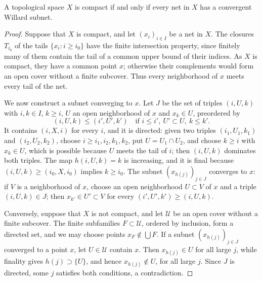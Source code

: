 \begin{proposition}\label{prop:compact-net-characterization}
A topological space $X$ is compact if and only if every net in $X$ has a convergent Willard subnet.
\end{proposition}
\begin{proof}
Suppose that $X$ is compact, and let $(x_i)_{i\in I}$ be a net in $X$. The closures $T_{i_0}$ of the tails $\{x_i:i\geq i_0\}$ have the finite intersection property, since finitely many of them contain the tail of a common upper bound of their indices. As $X$ is compact, they have a common point $x$; otherwise their complements would form an open cover without a finite subcover. Thus every neighborhood of $x$ meets every tail of the net.

We now construct a subnet converging to $x$. Let $J$ be the set of triples $(i,U,k)$ with $i,k\in I$, $k\geq i$, $U$ an open neighborhood of $x$ and $x_k\in U$, preordered by
\[
 (i,U,k)\leq(i',U',k')\quad\text{if }i\leq i',\ U'\subset U,\ k\leq k'.
\]
It contains $(i,X,i)$ for every $i$, and it is directed: given two triples $(i_1,U_1,k_1)$ and $(i_2,U_2,k_2)$, choose $i\geq i_1,i_2,k_1,k_2$, put $U=U_1\cap U_2$, and choose $k\geq i$ with $x_k\in U$, which is possible because $U$ meets the tail of $i$; then $(i,U,k)$ dominates both triples. The map $h(i,U,k)=k$ is increasing, and it is final because $(i,U,k)\geq(i_0,X,i_0)$ implies $k\geq i_0$. The subnet $(x_{h(j)})_{j\in J}$ converges to $x$: if $V$ is a neighborhood of $x$, choose an open neighborhood $U\subset V$ of $x$ and a triple $(i,U,k)\in J$; then $x_{k'}\in U'\subset V$ for every $(i',U',k')\geq(i,U,k)$.

Conversely, suppose that $X$ is not compact, and let $\mathcal U$ be an open cover without a finite subcover. The finite subfamilies $F\subset\mathcal U$, ordered by inclusion, form a directed set, and we may choose points $x_F\notin\bigcup F$. If a subnet $(x_{h(j)})_{j\in J}$ converged to a point $x$, let $U\in\mathcal U$ contain $x$. Then $x_{h(j)}\in U$ for all large $j$, while finality gives $h(j)\supset\{U\}$, and hence $x_{h(j)}\notin U$, for all large $j$. Since $J$ is directed, some $j$ satisfies both conditions, a contradiction.
\end{proof}

